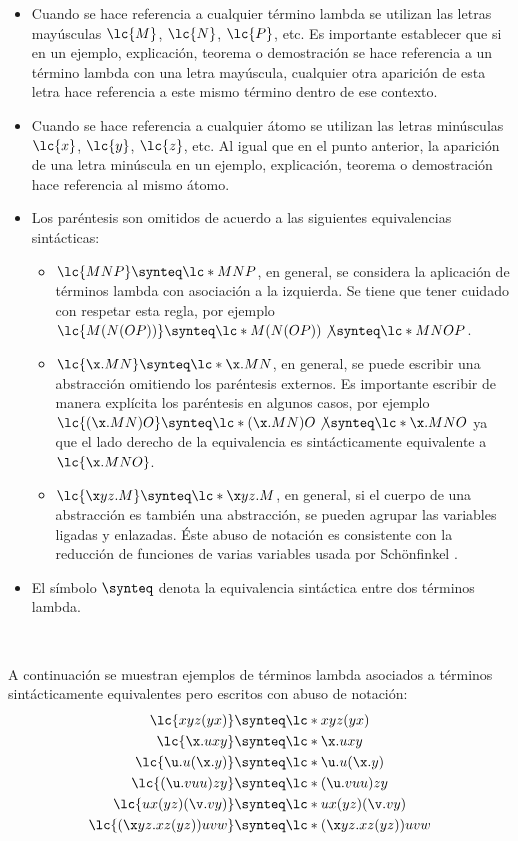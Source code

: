 \begin{itemize}
\item Cuando se hace referencia a cualquier término lambda se utilizan las letras mayúsculas \(\lc{M}\), \(\lc{N}\), \(\lc{P}\), etc. Es importante establecer que si en un ejemplo, explicación, teorema o demostración se hace referencia a un término lambda con una letra mayúscula, cualquier otra aparición de esta letra hace referencia a este mismo término dentro de ese contexto.
\item Cuando se hace referencia a cualquier átomo se utilizan las letras minúsculas \(\lc{x}\), \(\lc{y}\), \(\lc{z}\), etc. Al igual que en el punto anterior, la aparición de una letra minúscula en un ejemplo, explicación, teorema o demostración hace referencia al mismo átomo.
\item Los paréntesis son omitidos de acuerdo a las siguientes equivalencias sintácticas:
  \begin{itemize}
  \item \(\lc{M N P} \synteq \lc*{M N P}\), en general, se considera la aplicación de términos lambda con asociación a la izquierda. Se tiene que tener cuidado con respetar esta regla, por ejemplo \(\lc{M(N(O P))} \synteq \lc*{M(N(O P))} \not\synteq \lc*{M N O P}\).
  \item \(\lc{\x.M N} \synteq \lc*{\x.M N}\), en general, se puede escribir una abstracción omitiendo los paréntesis externos. Es importante escribir de manera explícita los paréntesis en algunos casos, por ejemplo \(\lc{(\x.M N) O} \synteq \lc*{(\x.M N) O} \not\synteq \lc*{\x.M N O}\) ya que el lado derecho de la equivalencia es sintácticamente equivalente a \(\lc{\x.M N O}\).
  \item \(\lc{\x y z.M} \synteq \lc*{\x y z.M}\), en general, si el cuerpo de una abstracción es también una abstracción, se pueden agrupar las variables ligadas y enlazadas. Éste abuso de notación es consistente con la reducción de funciones de varias variables usada por Schönfinkel \cite{Schonfinkel:Varargs}.
  \end{itemize}
\item El símbolo \(\synteq\) denota la equivalencia sintáctica entre dos términos lambda.
\end{itemize} \

A continuación se muestran ejemplos de términos lambda asociados a términos sintácticamente equivalentes pero escritos con abuso de notación: \\

\begin{align*}
  \lc{x y z (y x)} & \synteq \lc*{x y z (y x)}\\
  \lc{\x.u x y} & \synteq \lc*{\x.u x y}\\
  \lc{\u.u(\x.y)} & \synteq \lc*{\u.u(\x.y)}\\
  \lc{(\u.v u u)z y} & \synteq \lc*{(\u.v u u)z y}\\
  \lc{u x(y z)(\v.v y)} & \synteq \lc*{u x(y z)(\v.v y)}\\
  \lc{(\x y z.x z(y z))u v w} & \synteq \lc*{(\x y z.x z(y z))u v w}
\end{align*} \


